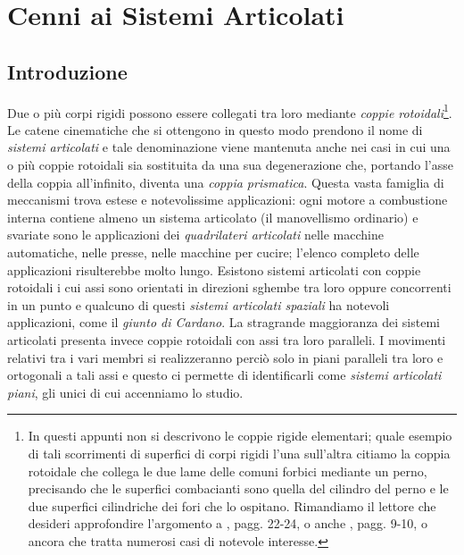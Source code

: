 \chapter{Cenni ai Sistemi Articolati}

\section{Introduzione}

\noindent Due o pi\`u corpi rigidi possono essere collegati tra loro mediante
{\em coppie rotoidali}\footnote{In questi appunti non si descrivono le coppie rigide 
elementari; quale esempio di tali scorrimenti di superfici di corpi rigidi l'una
sull'altra citiamo la coppia rotoidale che collega le due lame delle comuni forbici
mediante un perno, precisando che le superfici combacianti sono quella del cilindro
del perno e le due superfici cilindriche dei fori che lo ospitano. Rimandiamo  il
lettore che desideri approfondire l'argomento 
a \cite{sesini1}, pagg. 22-24, o anche \cite{martin}, pagg. 9-10, o ancora
\cite{sesini3} che tratta numerosi casi di notevole interesse.}.
\noindent Le catene cinematiche che si ottengono in questo modo prendono
il nome di {\em sistemi articolati} e tale denominazione
viene mantenuta anche nei casi in cui una o pi\`u coppie rotoidali sia sostituita
da una sua degenerazione che, portando l'asse della coppia all'infinito, diventa una
{\em coppia prismatica}.
Questa vasta famiglia di meccanismi trova estese e notevolissime applicazioni:
ogni motore a combustione interna contiene almeno un sistema articolato
(il manovellismo ordinario) e svariate
sono le applicazioni dei {\em quadrilateri articolati} 
nelle macchine automatiche, nelle presse, nelle macchine per cucire; l'elenco
completo delle applicazioni risulterebbe molto lungo.
Esistono sistemi articolati con coppie rotoidali i cui assi sono orientati
in direzioni sghembe tra loro oppure concorrenti in un  punto 
e qualcuno di questi {\em sistemi articolati spaziali}
ha notevoli applicazioni, come il {\em giunto di Cardano}. 
La stragrande maggioranza dei sistemi articolati presenta invece coppie rotoidali
con assi tra loro paralleli. I movimenti relativi tra i vari membri si 
realizzeranno perci\`o solo in piani paralleli tra loro e ortogonali
a tali assi e questo ci permette
di identificarli come {\em sistemi articolati piani},
gli unici di cui accenniamo lo studio.

